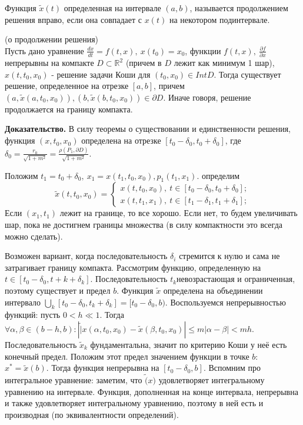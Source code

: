 \begin{defin}
Функция $\tilde x(t)$ определенная на интервале $(a,b)$, называется 
продолжением решения вправо, если она совпадает с $x(t)$ на некотором
подинтервале.
\end{defin}

\begin{theor}
    (о продолжении решения)\\
    Пусть дано уравнение $\frac{dx}{dt}=f(t,x),~x(t_0)=x_0$, 
    функции $f(t,x),~\frac{\partial f}{\partial x}$ непрерывны на компакте
    $D\subset \mathbb{R}^2$ (причем в $D$ лежит как минимум 1 шар),
    $x(t,t_0,x_0)$ - решение задачи Коши для  $(t_0,x_0)\in Int D$. 
    Тогда существует решение, определенное на отрезке $[a,b]$, причем
     $(a,\tilde x(a,t_0,x_0)),(b,\tilde x(b,t_0,x_0))\in \partial D$.
     Иначе говоря, решение продолжается на границу компакта.
\end{theor}
\textbf{Доказательство.} В силу теоремы о существовании и единственности 
решения, функция $(x,t_0,x_0)$ определена на отрезке $[t_0-\delta_0,
t_0+\delta_0]$, где $\delta_0=\frac{r_0}{\sqrt{1+m^2} }= \frac{\rho(P_1,
\partial D)}{\sqrt{1+m^2} }$. 

Положим $t_1=t_0+\delta_0,~x_1=x(t_1,t_0,x_0),p_1(t_1,x_1)$. 
определим 
$$\tilde x(t,t_0,x_0)=\begin{cases}
    x(t,t_0,x_0),~t\in [t_0-\delta_0,t_0+\delta_0];\\
    x(t,t_1,x_1),~t\in [t_1-\delta_1,t_1+\delta_1];
\end{cases}$$
Если $(x_1,t_1)$ лежит на границе, то все хорошо. Если нет, то будем 
увеличивать шар, пока не достигнем границы множества (в силу компактности 
это всегда можно сделать). 

Возможен вариант, когда последовательность $\delta_i$ стремится к нулю и 
сама не затрагивает границу компакта. Рассмотрим функцию, определенную 
на $t\in [t_0-\delta_0,t+k+\delta_k]$. Последовательность 
$t_k$невозрастающая и ограниченная, поэтому существует и предел 
$b$. Функция $\tilde x$  определена на объединении интервало
$\bigcup\limits_{k}[t_0-\delta_0,t_k+\delta_k]=[t_0-\delta_0,b)$.
Воспользуемся непрерывностью функций: пусть $0<h\ll1$.
Тогда $\forall \alpha,\beta\in (b-h,b):|\tilde| x(\alpha,t_0,x_0)-
\tilde x(\beta,t_0,x_0)|\leqslant m|\alpha-\beta|<mh$. 
Последовательность $\tilde x_k$ фундаментальна, значит по критерию Коши 
у неё есть конечный предел. Положим этот предел значением функции 
в точке $b$:  $x^*=\tilde x(b)$. Тогда функция непрерывна на $[t_0-\delta_0,
b]$. Вспомним про интегральное уравнение: заметим, что $\tilde(x)$ 
удовлетворяет интегральному уравнению на интервале. Функция, дополненная
на конце интервала, непрерывна и также удовлетворяет интегральному 
уравнению, поэтому в ней есть и производная (по эквивалентности
определений).

